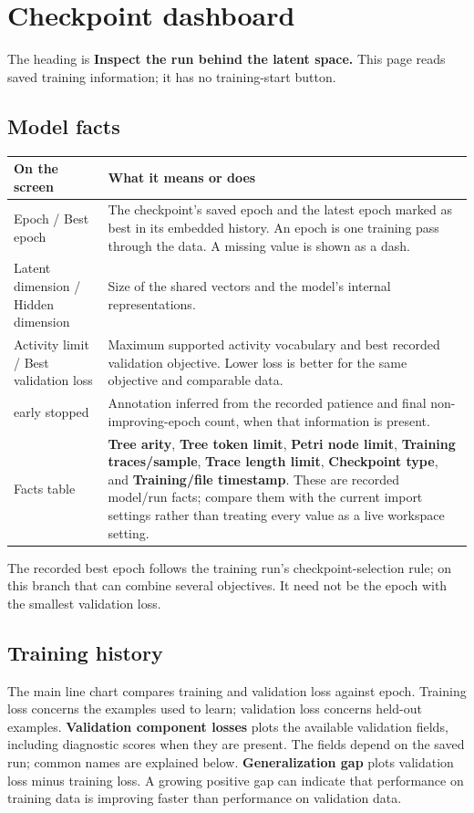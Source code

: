 \documentclass[11pt,a4paper]{article}
\makeatletter
\newcommand{\ui}[1]{\textbf{#1}}
\newenvironment{controls}{%
  \small\begin{longtable}{@{}>{\raggedright\arraybackslash}p{.34\linewidth}
    >{\raggedright\arraybackslash}p{.62\linewidth}@{}}
  \toprule\textbf{On the screen} & \textbf{What it means or does}\\\midrule\endhead
  \bottomrule\endfoot
}{\end{longtable}\normalsize}
\makeatother
\begin{document}
\section{Checkpoint dashboard}
\label{sec:checkpoint}
The heading is \ui{Inspect the run behind the latent space.} This page reads
saved training information; it has no training-start button.

\subsection{Model facts}
\begin{controls}
Epoch / Best epoch & The checkpoint's saved epoch and the latest epoch marked
as best in its embedded history. An epoch is one training pass through the
data. A missing value is shown as a dash.\\
Latent dimension / Hidden dimension & Size of the shared vectors and the
model's internal representations.\\
Activity limit / Best validation loss & Maximum supported activity vocabulary
and best recorded validation objective. Lower loss is better for the same
objective and comparable data.\\
early stopped & Annotation inferred from the recorded patience and final
non-improving-epoch count, when that information is present.\\
Facts table & \ui{Tree arity}, \ui{Tree token limit}, \ui{Petri node limit},
\ui{Training traces/sample}, \ui{Trace length limit}, \ui{Checkpoint type},
and \ui{Training/file timestamp}. These are recorded model/run facts; compare
them with the current import settings rather than treating every value as a
live workspace setting.\\
\end{controls}

The recorded best epoch follows the training run's checkpoint-selection rule;
on this branch that can combine several objectives. It need not be the epoch
with the smallest validation loss.

\subsection{Training history}
The main line chart compares training and validation loss against epoch.
Training loss concerns the examples used to learn; validation loss concerns
held-out examples. \ui{Validation component losses} plots the available
validation fields, including diagnostic scores when they are present. The
fields depend on the saved run; common names are explained below.
\ui{Generalization gap} plots validation loss minus training
loss. A growing positive gap can indicate that performance on training data
is improving faster than performance on validation data.
\end{document}
